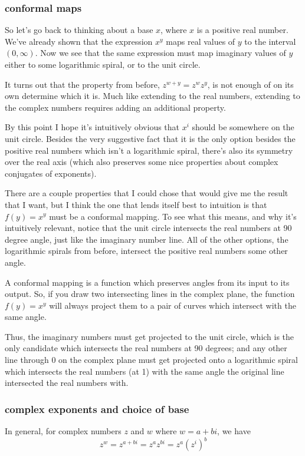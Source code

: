 \documentclass[11pt, oneside]{article}   	%
\begin{document}
\subsubsection{conformal maps}

So let's go back to thinking about a base $x$, where $x$ is a positive real number. We've already shown that the expression $x^y$ maps real values of $y$ to the interval \((0,\infty)\). Now we see that the same expression must map imaginary values of $y$ either to some logarithmic spiral, or to the unit circle.

It turns out that the property from before, \(z^{w+y}=z^wz^y\), is not enough of on its own determine which it is. Much like extending to the real numbers, extending to the complex numbers requires adding an additional property.

By this point I hope it's intuitively obvious that $x^i$ should be somewhere on the unit circle. Besides the very suggestive fact that it is the only option besides the positive real numbers which isn't a logarithmic spiral, there's also its symmetry over the real axis (which also preserves some nice properties about complex conjugates of exponents).

There are a couple properties that I could chose that would give me the result that I want, but I think the one that lends itself best to intuition is that $f(y)=x^y$ must be a conformal mapping. To see what this means, and why it's intuitively relevant, notice that the unit circle intersects the real numbers at 90 degree angle, just like the imaginary number line. All of the other options, the logarithmic spirals from before, intersect the positive real numbers some other angle.

A conformal mapping is a function which preserves angles from its input to its output. So, if you draw two intersecting lines in the complex plane, the function $f(y)=x^y$ will always project them to a pair of curves which intersect with the same angle.

Thus, the imaginary numbers must get projected to the unit circle, which is the only candidate which intersects the real numbers at 90 degrees; and any other line through $0$ on the complex plane must get projected onto a logarithmic spiral which intersects the real numbers (at 1) with the same angle the original line intersected the real numbers with. 

\subsubsection{complex exponents and choice of base}
In general, for complex numbers $z$ and $w$ where $w=a+bi$, we have \[z^w=z^{a+bi}=z^az^{bi}=z^a(z^i)^b\]
\end{document}
